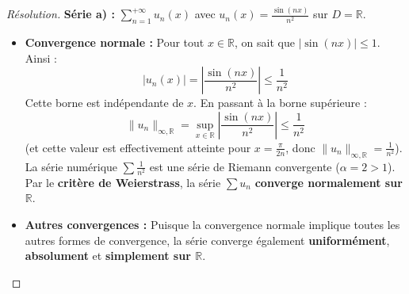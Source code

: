 \documentclass[12pt,a4paper]{report}
\begin{document}
\begin{proof}[Résolution]
\textbf{Série a) :} $\sum_{n=1}^{+\infty} u_n(x)$ avec $u_n(x) = \frac{\sin(nx)}{n^2}$ sur $D = \mathbb{R}$.
\begin{itemize}
    \item \textbf{Convergence normale :}
    Pour tout $x \in \mathbb{R}$, on sait que $|\sin(nx)| \le 1$. Ainsi :
    \[ |u_n(x)| = \left| \frac{\sin(nx)}{n^2} \right| \le \frac{1}{n^2} \]
    Cette borne est indépendante de $x$. En passant à la borne supérieure :
    \[ \|u_n\|_{\infty, \mathbb{R}} = \sup_{x \in \mathbb{R}} \left| \frac{\sin(nx)}{n^2} \right| \le \frac{1}{n^2} \]
    (et cette valeur est effectivement atteinte pour $x = \frac{\pi}{2n}$, donc $\|u_n\|_{\infty, \mathbb{R}} = \frac{1}{n^2}$).\\
    La série numérique $\sum \frac{1}{n^2}$ est une série de Riemann convergente ($\alpha = 2 > 1$).
    Par le \textbf{critère de Weierstrass}, la série $\sum u_n$ \textbf{converge normalement sur $\mathbb{R}$}.
    \item \textbf{Autres convergences :}
    Puisque la convergence normale implique toutes les autres formes de convergence, la série converge également \textbf{uniformément}, \textbf{absolument} et \textbf{simplement sur $\mathbb{R}$}.
\end{itemize}


\end{proof}
\end{document}
